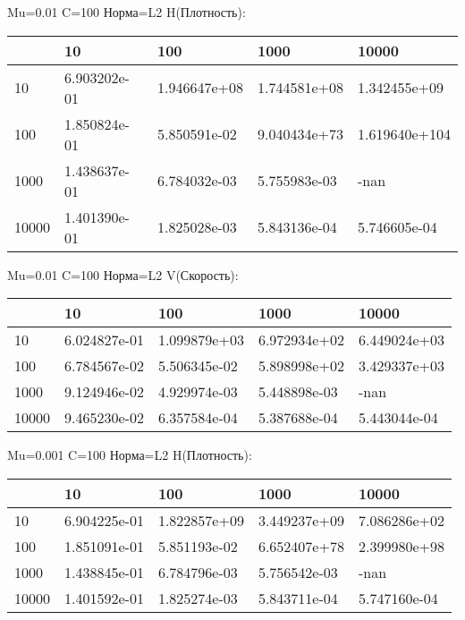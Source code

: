\documentclass[a4paper, 12pt]{article}
\begin{document}
\bigskip
\bigskip
\bigskip


Mu=0.01  C=100 Норма=L2 H(Плотность):


\begin{tabular}{lllll}
\toprule
{} &         10    &         100   &         1000  &          10000 \\
\midrule
10    &  6.903202e-01 &  1.946647e+08 &  1.744581e+08 &   1.342455e+09 \\
100   &  1.850824e-01 &  5.850591e-02 &  9.040434e+73 &  1.619640e+104 \\
1000  &  1.438637e-01 &  6.784032e-03 &  5.755983e-03 &           -nan \\
10000 &  1.401390e-01 &  1.825028e-03 &  5.843136e-04 &   5.746605e-04 \\
\bottomrule
\end{tabular}



\bigskip
\bigskip
\bigskip


Mu=0.01  C=100 Норма=L2 V(Скорость):


\begin{tabular}{lllll}
\toprule
{} &         10    &         100   &         1000  &         10000 \\
\midrule
10    &  6.024827e-01 &  1.099879e+03 &  6.972934e+02 &  6.449024e+03 \\
100   &  6.784567e-02 &  5.506345e-02 &  5.898998e+02 &  3.429337e+03 \\
1000  &  9.124946e-02 &  4.929974e-03 &  5.448898e-03 &          -nan \\
10000 &  9.465230e-02 &  6.357584e-04 &  5.387688e-04 &  5.443044e-04 \\
\bottomrule
\end{tabular}



\bigskip
\bigskip
\bigskip


Mu=0.001  C=100 Норма=L2 H(Плотность):


\begin{tabular}{lllll}
\toprule
{} &         10    &         100   &         1000  &         10000 \\
\midrule
10    &  6.904225e-01 &  1.822857e+09 &  3.449237e+09 &  7.086286e+02 \\
100   &  1.851091e-01 &  5.851193e-02 &  6.652407e+78 &  2.399980e+98 \\
1000  &  1.438845e-01 &  6.784796e-03 &  5.756542e-03 &          -nan \\
10000 &  1.401592e-01 &  1.825274e-03 &  5.843711e-04 &  5.747160e-04 \\
\bottomrule
\end{tabular}
\end{document}
